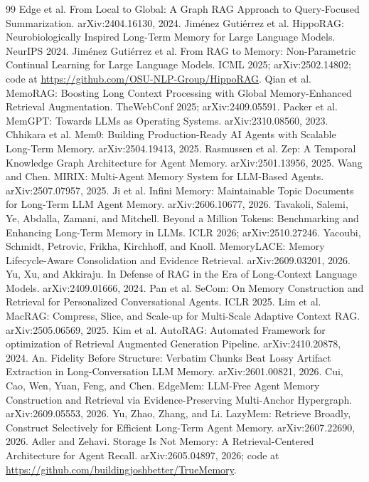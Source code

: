 \documentclass{article}
\begin{document}
\begin{thebibliography}{99}
 Edge et al. From Local to Global: A Graph RAG Approach to Query-Focused Summarization. arXiv:2404.16130, 2024.
 Jim\'enez Guti\'errez et al. HippoRAG: Neurobiologically Inspired Long-Term Memory for Large Language Models. NeurIPS 2024.
 Jim\'enez Guti\'errez et al. From RAG to Memory: Non-Parametric Continual Learning for Large Language Models. ICML 2025; arXiv:2502.14802; code at \url{https://github.com/OSU-NLP-Group/HippoRAG}.
 Qian et al. MemoRAG: Boosting Long Context Processing with Global Memory-Enhanced Retrieval Augmentation. TheWebConf 2025; arXiv:2409.05591.
 Packer et al. MemGPT: Towards LLMs as Operating Systems. arXiv:2310.08560, 2023.
 Chhikara et al. Mem0: Building Production-Ready AI Agents with Scalable Long-Term Memory. arXiv:2504.19413, 2025.
 Rasmussen et al. Zep: A Temporal Knowledge Graph Architecture for Agent Memory. arXiv:2501.13956, 2025.
 Wang and Chen. MIRIX: Multi-Agent Memory System for LLM-Based Agents. arXiv:2507.07957, 2025.
 Ji et al. Infini Memory: Maintainable Topic Documents for Long-Term LLM Agent Memory. arXiv:2606.10677, 2026.
 Tavakoli, Salemi, Ye, Abdalla, Zamani, and Mitchell. Beyond a Million Tokens: Benchmarking and Enhancing Long-Term Memory in LLMs. ICLR 2026; arXiv:2510.27246.
 Yacoubi, Schmidt, Petrovic, Frikha, Kirchhoff, and Knoll. MemoryLACE: Memory Lifecycle-Aware Consolidation and Evidence Retrieval. arXiv:2609.03201, 2026.
 Yu, Xu, and Akkiraju. In Defense of RAG in the Era of Long-Context Language Models. arXiv:2409.01666, 2024.
 Pan et al. SeCom: On Memory Construction and Retrieval for Personalized Conversational Agents. ICLR 2025.
 Lim et al. MacRAG: Compress, Slice, and Scale-up for Multi-Scale Adaptive Context RAG. arXiv:2505.06569, 2025.
 Kim et al. AutoRAG: Automated Framework for optimization of Retrieval Augmented Generation Pipeline. arXiv:2410.20878, 2024.
 An. Fidelity Before Structure: Verbatim Chunks Beat Lossy Artifact Extraction in Long-Conversation LLM Memory. arXiv:2601.00821, 2026.
 Cui, Cao, Wen, Yuan, Feng, and Chen. EdgeMem: LLM-Free Agent Memory Construction and Retrieval via Evidence-Preserving Multi-Anchor Hypergraph. arXiv:2609.05553, 2026.
 Yu, Zhao, Zhang, and Li. LazyMem: Retrieve Broadly, Construct Selectively for Efficient Long-Term Agent Memory. arXiv:2607.22690, 2026.
 Adler and Zehavi. Storage Is Not Memory: A Retrieval-Centered Architecture for Agent Recall. arXiv:2605.04897, 2026; code at \url{https://github.com/buildingjoshbetter/TrueMemory}.

\end{thebibliography}
\end{document}
